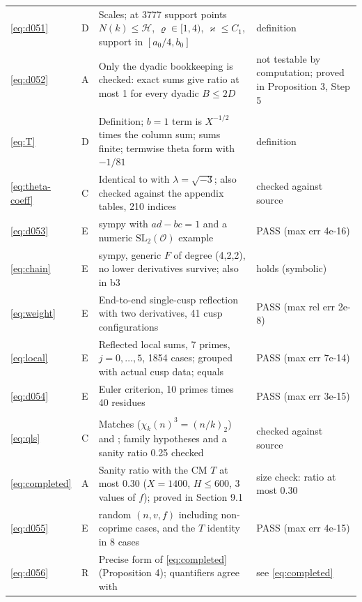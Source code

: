 \documentclass[11pt]{article}
\numberwithin{equation}{section}
\begin{document}
\begin{longtable}{@{}>{\raggedright\arraybackslash}p{1.2cm}>{\centering\arraybackslash}p{0.7cm}>{\raggedright\arraybackslash}p{9.05cm}>{\raggedright\arraybackslash}p{4.3cm}@{}}
\eqref{eq:d051} & D & Scales; at 3777 support points $N(k)\le\mathcal H$, $\varrho\in[1,4)$, $\varkappa\le C_1$, support in $[a_0/4,b_0]$ & definition\\
\eqref{eq:d052} & A & Only the dyadic bookkeeping is checked: exact sums give ratio at most 1 for every dyadic $B\le2D$ & not testable by computation; proved in Proposition 3, Step 5\\
\multicolumn{4}{@{}l}{\emph{Section~8}}\\
\eqref{eq:T} & D & Definition; $b=1$ term is $X^{-1/2}$ times the column sum; sums finite; termwise theta form with $-1/81$ & definition\\
\eqref{eq:theta-coeff} & C & Identical to \cite[Corollary~24(2)]{QF} with $\lambda=\sqrt{-3}$; also checked against the appendix tables, 210 indices & checked against source\\
\eqref{eq:d053} & E & sympy with $ad-bc=1$ and a numeric $\mathrm{SL}_2(\mathcal O)$ example & PASS (max err 4e-16)\\
\eqref{eq:chain} & E & sympy, generic $F$ of degree (4,2,2), no lower derivatives survive; also in b3 & holds (symbolic)\\
\eqref{eq:weight} & E & End-to-end single-cusp reflection with two derivatives, 41 cusp configurations & PASS (max rel err 2e-8)\\
\eqref{eq:local} & E & Reflected local sums, 7 primes, $j=0,\dots,5$, 1854 cases; grouped with actual cusp data; equals \cite[(6.5)]{OAI1112} & PASS (max err 7e-14)\\
\eqref{eq:d054} & E & Euler criterion, 10 primes times 40 residues & PASS (max err 3e-15)\\
\multicolumn{4}{@{}l}{\emph{Section~9}}\\
\eqref{eq:qls} & C & Matches \cite[Lemma~6.5]{OAI1112} ($\chi_k(n)^3=(n/k)_2$) and \cite[Theorem~1.1]{GL}; family hypotheses and a sanity ratio 0.25 checked & checked against source\\
\eqref{eq:completed} & A & Sanity ratio with the CM $T$ at most 0.30 ($X=1400$, $H\le600$, 3 values of $f$); proved in Section 9.1 & size check: ratio at most 0.30\\
\eqref{eq:d055} & E & 400 random $(n,v,f)$ including non-coprime cases, and the $T$ identity in 8 cases & PASS (max err 4e-15)\\
\eqref{eq:d056} & R & Precise form of \eqref{eq:completed} (Proposition 4); quantifiers agree with \cite[Proposition~5.2]{OAI1112} & see \eqref{eq:completed}\\

\end{longtable}
\end{document}
